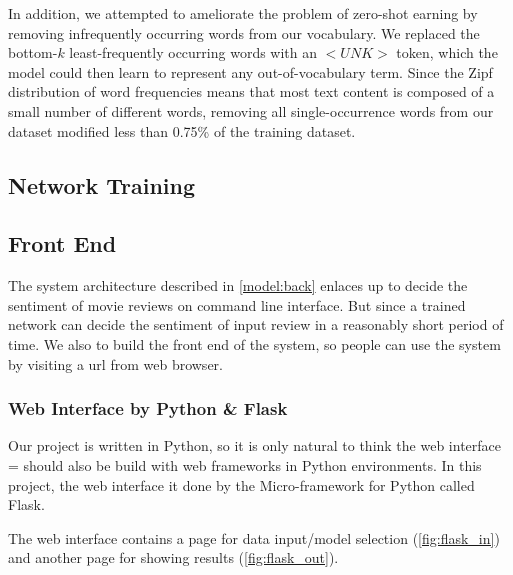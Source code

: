 \documentclass[conference]{IEEEtran}
\begin{document}
    In addition, we attempted to ameliorate the problem of zero-shot earning by removing 
    infrequently occurring words from our vocabulary. We replaced the bottom-$k$ 
    least-frequently occurring words with an $<UNK>$ token, which the model could then
    learn to represent any out-of-vocabulary term. Since the Zipf distribution of word frequencies
    means that most text content is composed of a small number of different words, removing all
    single-occurrence words from our dataset modified less than 0.75\% of the training dataset.

   
\subsection{Network Training}
   

\subsection{Front End}
\label{model:front}
    
    The system architecture described in \autoref{model:back} enlaces up to decide the
    sentiment of movie reviews on command line interface. But since a trained network can
    decide the sentiment of input review in a reasonably short period of time. We also
    to build the front end of the system, so people can use the system by visiting a
    url from web browser.
    
\subsubsection{Web Interface by Python \& Flask}
\label{model:front:web}
    Our project is written in Python, so it is only natural to think the web interface =
    should also be build with web frameworks in Python environments. 
    In this project, the web interface it done by the Micro-framework for 
    Python called Flask\cite{ronacher2010flask,grinberg2018flask}.
    
    The web interface contains a page for data input/model selection 
    (\autoref{fig:flask_in}) and another page for
    showing results (\autoref{fig:flask_out}).
    
\end{document}
